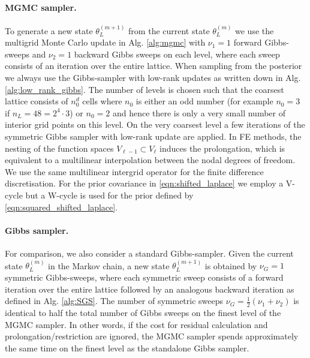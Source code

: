 \documentclass[11pt,english]{article}
\theoremstyle{plain}
\theoremstyle{plain}
\theoremstyle{plain}
\theoremstyle{plain}
\numberwithin{equation}{section}
\newcommand{\jg}[1]{#1}
\begin{document}
\paragraph{MGMC sampler.}
To generate a new state $\theta_L^{(m+1)}$ from the current state $\theta_L^{(m)}$ we use the multigrid Monte Carlo update in Alg. \ref{alg:mgmc} with $\nu_1=1$ forward Gibbs-sweeps and $\nu_2=1$ backward Gibbs sweeps on each level, where each sweep consists of an iteration over the entire lattice. When sampling from the posterior we always use the Gibbs-sampler with low-rank updates as written down in Alg. \ref{alg:low_rank_gibbs}. The number of levels is chosen such that the coarsest lattice consists of $n_0^d$ cells where $n_0$ is either an odd number (for example $n_0=3$ if $n_L=48=2^4\cdot 3$) or $n_0=2$ and hence there is only a very small number of interior grid points on this level. On the very coarsest level a few iterations of the symmetric Gibbs sampler with low-rank update are applied.
%
\jg{In FE methods, the nesting of the function spaces $V_{\ell-1}\subset V_{\ell}$ induces the prolongation, which is equivalent to a multilinear interpolation between the nodal degrees of freedom. We use the same multilinear intergrid operator for the finite difference discretisation.}
% 
For the prior covariance in \eqref{eqn:shifted_laplace} we employ a V-cycle but a W-cycle is used for the prior defined by \eqref{eqn:squared_shifted_laplace}.
\paragraph{Gibbs sampler.}
For comparison, we also consider a standard Gibbs-sampler. Given the current state $\theta_L^{(m)}$ in the Markov chain, a new state $\theta_L^{(m+1)}$ is obtained by $\nu_G=1$ symmetric Gibbs-sweeps, where each symmetric sweep consists of a forward iteration over the entire lattice followed by an analogous backward iteration as defined in Alg. \ref{alg:SGS}. The number of symmetric sweeps $\nu_G=\frac{1}{2}(\nu_1+\nu_2)$ is identical to half the total number of Gibbs sweeps on the finest level of the MGMC sampler. In other words, if the cost for residual calculation and prolongation/restriction are ignored, the MGMC sampler spends approximately the same time on the finest level as the standalone Gibbs sampler.
\end{document}
